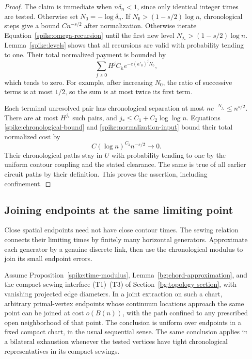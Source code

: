 \begin{proof}
The claim is immediate when $n\delta_n<1$, since only identical integer
times are tested.  Otherwise set $N_0=-\log\delta_n$.
If $N_0>(1-s/2)\log n$, chronological steps
give a bound $C n^{-s/2}$ after normalization.  Otherwise iterate
Equation~\eqref{spike:omega-recursion} until the first new level
$N_{j_*}>(1-s/2)\log n$.  Lemma~\ref{spike:levels} shows that all recursions
are valid with probability tending to one.  Their total normalized
payment is bounded by
\[
 \sum_{j\ge0}H^j C_h e^{-c(a'_0)^jN_0},
\]
which tends to zero.  For example, after increasing $N_0$, the ratio of
successive terms is at most $1/2$, so the sum is at most twice its first
term.

Each terminal unresolved pair has chronological separation at most
$n e^{-N_{j_*}}\le n^{s/2}$.  There are at most $H^{j_*}$ such pairs, and
$j_*\le C_1+C_2\log\log n$.  Equations
\eqref{spike:chronological-bound} and
\eqref{spike:normalization-input} bound their total normalized cost by
\[
 C(\log n)^{C_3}n^{-s/2}\longrightarrow0.
\]
Their chronological paths stay in $U$ with probability tending to one
by the uniform contour coupling and the stated clearance.  The same is
true of all earlier circuit paths by their definition.  This proves the
assertion, including confinement.
\end{proof}

\subsection{Joining endpoints at the same limiting point}

Close spatial endpoints need not have close contour times.  The sewing
relation connects their limiting times by finitely many horizontal
generators.  Approximate each generator by a genuine discrete link, then
use the chronological modulus to join its small endpoint errors.

\begin{proposition}\label{spike:spatial-modulus}
Assume Proposition~\ref{spike:time-modulus},
Lemma~\ref{bg:chord-approximation}, and the compact sewing interface
(T1)--(T3) of Section~\ref{bg:topology-section}, with vanishing projected
edge diameters.  In a joint extraction on such a chart, arbitrary
primal-vertex endpoints whose continuum locations approach the same point
can be joined at cost $o(B(n))$, with the path confined to any prescribed
open neighborhood of that point.  The conclusion is uniform over
endpoints in a fixed compact chart, in the usual sequential sense.
The same conclusion applies in a bilateral exhaustion whenever the
tested vertices have tight chronological representatives in its
compact sewings.
\end{proposition}


